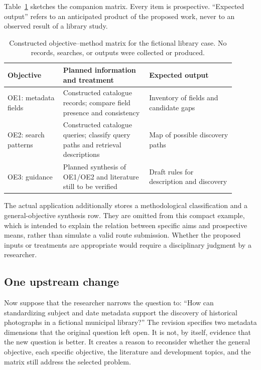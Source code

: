 Table~\ref{tab:walkthrough-matrix} sketches the companion matrix. Every item is prospective. ``Expected output'' refers to an anticipated product of the proposed work, never to an observed result of a library study.

\begin{table}[htbp]
\centering
\small
\caption{Constructed objective--method matrix for the fictional library case. No records, searches, or outputs were collected or produced.}
\label{tab:walkthrough-matrix}
\begin{tabular}{>{\raggedright\arraybackslash}p{0.22\linewidth} >{\raggedright\arraybackslash}p{0.34\linewidth} >{\raggedright\arraybackslash}p{0.34\linewidth}}
\hline
Objective & Planned information and treatment & Expected output \\
\hline
OE1: metadata fields & Constructed catalogue records; compare field presence and consistency & Inventory of fields and candidate gaps \\
OE2: search patterns & Constructed catalogue queries; classify query paths and retrieval descriptions & Map of possible discovery paths \\
OE3: guidance & Planned synthesis of OE1/OE2 and literature still to be verified & Draft rules for description and discovery \\
\hline
\end{tabular}
\end{table}

The actual application additionally stores a methodological classification and a general-objective synthesis row. They are omitted from this compact example, which is intended to explain the relation between specific aims and prospective means, rather than simulate a valid route submission. Whether the proposed inputs or treatments are appropriate would require a disciplinary judgment by a researcher.

\subsection{One upstream change}

Now suppose that the researcher narrows the question to: ``How can standardizing subject and date metadata support the discovery of historical photographs in a fictional municipal library?'' The revision specifies two metadata dimensions that the original question left open. It is not, by itself, evidence that the new question is better. It creates a reason to reconsider whether the general objective, each specific objective, the literature and development topics, and the matrix still address the selected problem.

